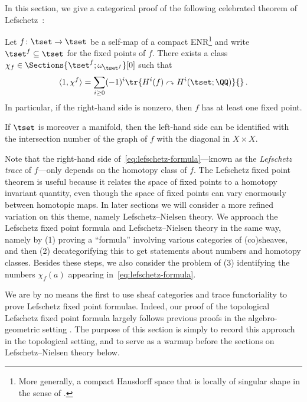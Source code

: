 
In this section, we give a categorical proof of the following celebrated theorem of Lefschetz~\cite{Lefschetz1926,Lefschetz1937}:

\begin{thm}\label{thm: lefschetz formula}
  Let $f\colon \tset\to \tset $ be a self-map of a compact ENR\footnote{More generally, a compact Hausdorff space that is locally of singular shape in the sense of \cite[Defn~A.4.15]{Lurie2017}.} and write $\tset^{f}\subseteq \tset$ for the fixed points of $f$.
  There exists a class $\chi_f \in\Sections{\tset^f;\omega_{\tset^f}}[0]$ such that
  \begin{equation}
    \label{eq:lefschetz-formula}
    \langle 1 ,\chi^f\rangle = \sum_{i\geq 0}(-1)^{i} \tr{H^{i}(f)\curvearrowright H^{i}(\tset;\QQ )}{}\, .
  \end{equation}
  In particular, if the right-hand side is nonzero, then $f$ has at least one fixed point.
  
  If $\tset$ is moreover a manifold, then the left-hand side can be identified with
  the intersection number of the graph of $f$ with the diagonal in $X\times X$.
\end{thm}
Note that the right-hand side of~\eqref{eq:lefschetz-formula}---known as the {\em Lefschetz trace} of $f$---only depends on the homotopy class of $f$. The Lefschetz fixed point theorem is useful because it relates the space of fixed points to a homotopy invariant quantity, even though the space of fixed points can vary enormously between homotopic maps. In later sections we will consider a more refined variation on this theme, namely Lefschetz--Nielsen theory. We approach the Lefschetz fixed point formula and Lefschetz--Nielsen theory in the same way, namely by (1) proving a ``formula'' involving various categories of (co)sheaves, and then (2) decategorifying this to get statements about numbers and homotopy classes. Besides these steps, we also consider the problem of (3) identifying the numbers $\chi_f(a)$ appearing in~\eqref{eq:lefschetz-formula}.

We are by no means the first to use sheaf categories and trace functoriality to prove Lefschetz fixed point formulae. Indeed, our proof of the topological Lefschetz fixed point formula largely follows previous proofs in the algebro-geometric setting \cite{Ben-Zvi_Nadler2021,Kondyrev_Prikhodko2020}. The purpose of this section is simply to record this approach in the topological setting, and to serve as a warmup before the sections on Lefschetz--Nielsen theory below.

